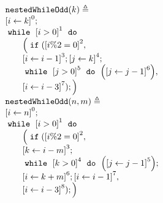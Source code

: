 \begin{example}
  \label{ex:nestedWhileOdd}
  { \small
  \begin{figure}
  \centering
  \begin{subfigure}{.4\textwidth}
    \begin{centering}
    {\small
    $
    \begin{array}{l}
      \kw{nestedWhileOdd}(k) \triangleq \\
      \clabel{ \assign{i}{k} }^{0} ; \\
          \ewhile ~ \clabel{i > 0}^{1} ~ \edo ~ \\
          \qquad \Big(
            \eif(\clabel{i \% 2 = 0 }^{2},\\
            \qquad \clabel{\assign{i}{i - 1}}^{3};
            \clabel{\assign{j}{k}}^{4}; \\
            \qquad \ewhile ~ \clabel{j > 0}^{5} ~ \edo ~
            \Big( \clabel{\assign{j}{j - 1}}^{6} \Big),\\
            \qquad \clabel{\assign{i}{i - 3}}^{7});
            \Big)
      \end{array}
    $
    }
    {\small
    $
    \begin{array}{l}
      \kw{nestedWhileOdd}(n, m) \triangleq \\
      \clabel{ \assign{i}{n} }^{0} ; \\
          \ewhile ~ \clabel{i > 0}^{1} ~ \edo ~ \\
          \qquad \Big(
            \eif(\clabel{i \% 2 = 0 }^{2},\\
            \qquad \clabel{\assign{k}{i - m}}^{3};\\
            \qquad \ewhile ~ \clabel{k > 0}^{4} ~ \edo ~
            \Big( \clabel{\assign{j}{j - 1}}^{5} \Big);\\
            \qquad \clabel{\assign{i}{k + m}}^{6};
            \clabel{\assign{i}{i - 1}}^{7}, \\
            \qquad \clabel{\assign{i}{i - 3}}^{8});
            \Big)
      \end{array}
    $
    }
    \caption{}
    \end{centering}
    \end{subfigure}
  \begin{subfigure}{.5\textwidth}
    \begin{centering}
\end{centering}
\end{subfigure}
\end{figure}}
\end{example}
